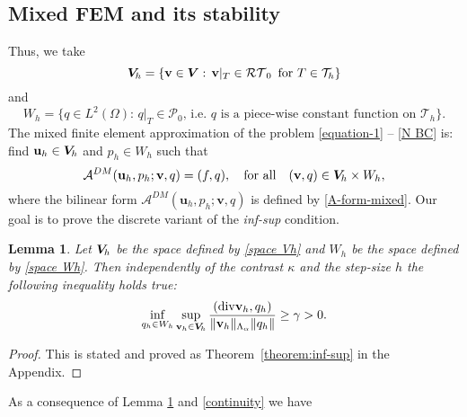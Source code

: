 \documentclass[11pt]{amsart}
\numberwithin{equation}{section}
\newtheorem{lemma}{Lemma}[section]
\theoremstyle{definition}\newtheorem{example}{Example}[section]
\begin{document}
\subsection{Mixed FEM and its stability}
Thus, 
we take 
\begin{equation}\label{space Vh}
{{\boldsymbol V}_{\hspace{-0.2mm}h}}=\{ {{\mathbf v}} \in {{\boldsymbol V}}: \, {{\mathbf v}} |_T \in {{\mathcal{RT}}_{{0}}} \,\,\, \mbox{for} \,\, T \in {\mathcal T}_h\} 
\end{equation}
and 
\begin{equation}\label{space Wh}
W_h =\{ q \in L^2(\Omega): \, q|_{T} \in {\mathcal P}_0, 
\, \text{i.e. $q$ is a piece-wise constant function on} \,\,  {\mathcal T}_h\}.
\end{equation}
The mixed finite element approximation 
of  the problem \eqref{equation-1} -- \eqref{N BC}
 is: find  ${{\mathbf u}}_h \in {{\boldsymbol V}_{\hspace{-0.2mm}h}}$ and $p_h \in W_h$ such that
\begin{equation}\label{eq:dual_mixed_FEM}
{{\mathcal A}}^{DM}({{\mathbf u}}_h,p_h; {{\mathbf v}},q)=(f,q), 
\quad \mbox{for all}\quad ({{\mathbf v}}, q) \in {{\boldsymbol V}_{\hspace{-0.2mm}h}} \times W_h,
\end{equation}
where the bilinear form $ {{\mathcal A}}^{DM}({{\mathbf u}}_h,p_h; {{\mathbf v}},q)$ is defined by 
\eqref{A-form-mixed}.
Our goal is to prove the discrete variant of the {\it inf-sup} condition.
\begin{lemma}\label{lem:stab_fin}
Let ${{\boldsymbol V}_{\hspace{-0.2mm}h}}$ be the space defined by \eqref{space Vh} and $W_h$ be the space defined by
\eqref{space Wh}.
Then independently of the contrast $\kappa$ and the step-size $h$
the following inequality holds true:
\begin{equation}\label{inf_sup_fin_set}
 \inf_{q_h\in W_h}\sup_{{{\mathbf v}}_h\in{{\boldsymbol V}_{\hspace{-0.2mm}h}}}
\frac{({\operatorname{div}} {{\mathbf v}}_h,q_h)}{\Vert {{\mathbf v}}_h\Vert_{\Lambda_{{\alpha}}} \Vert q_h\Vert}\ge 
\gamma >0 . 
\end{equation}
\end{lemma}
\begin{proof}
This is stated and proved as Theorem~\ref{theorem:inf-sup} in the
Appendix. 
\end{proof}
As a consequence of Lemma \ref{lem:stab_fin} and \eqref{continuity}  we have
\end{document}
